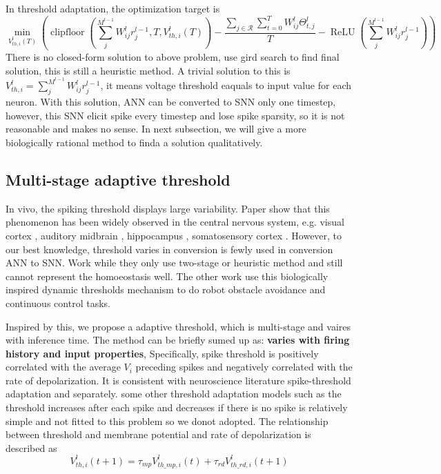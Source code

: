 \documentclass{article}
\begin{document}
In threshold adaptation, the optimization target is 
\begin{equation}
  \min\limits_{V_{th,i}^l(T)}\left(\operatorname{clipfloor}\left(\sum_j^{M^{l-1}}W_{ij}^lr_j^{l-1}, T, V_{th,i}^l(T)\right) - \frac{\sum_{j \in \mathcal{R}} \sum_{t=0}^TW_{ij}^l\Theta_{t,j}^l }{T} - \operatorname{ReLU}\left(\sum_j^{M^{l-1}}W_{ij}^lr_j^{l-1}\right)\right)
\end{equation}
There is no closed-form solution to above problem, \cite{li2021free} use gird search to find final solution, this is still a heuristic method.
A trivial solution to this is $V_{th,i}^l=\sum_j^{M^{l-1}}W_{ij}^lr_j^{l-1}$, it means voltage threshold eaquals to input value for each neuron. With this solution, ANN can be converted to SNN only one timestep, however, this SNN elicit spike every timestep and lose spike sparsity, so it is not reasonable and makes no sense.
In next subsection, we will give a more biologically rational method to finda a solution qualitatively.

\subsection{Multi-stage adaptive threshold}

In vivo, the spiking threshold displays large variability. Paper \cite{fontaine2014spike} show that this phenomenon has been widely observed in
the central nervous system, e.g. visual cortex \cite{azouz2000dynamic, azouz2003adaptive}, auditory
midbrain \cite{pena2002postsynaptic}, hippocampus \cite{henze2001action}, somatosensory cortex \cite{wilent2005stimulus}. 
However, to our best knowledge, threshold varies in conversion is fewly used in conversion ANN to SNN. Work\cite{kim2020towards,chen2022adaptive,li2021free} while they only use two-stage or heuristic method and still cannot represent the homoeostasis well.
The other work\cite{ding2022biologically} use this biologically inspired dynamic thresholds mechanism to do robot obstacle avoidance and continuous control tasks. 

Inspired by this, we propose a adaptive threshold, which is multi-stage and vaires with inference time.
The method can be briefly sumed up as: \textbf{varies with firing history and input properties},
Specifically, spike threshold is positively correlated with the average $V_i$ preceding spikes and negatively correlated with the rate of depolarization. 
It is consistent with neuroscience literature spike-threshold adaptation \cite{platkiewicz2010threshold, fontaine2014spike} and \cite{azouz2000dynamic} separately.
some other threshold adaptation models such as the threshold increases after each spike and decreases if there is no spike\cite{querlioz2013immunity, diehl2015unsupervised} is relatively simple and not fitted to this problem so we donot adopted. 
The relationship between threshold and membrane potential and rate of depolarization is described as
\begin{equation}
  V_{th,i}^l(t+1) = \tau_{mp}V_{th\_mp,i}^l(t) + \tau_{rd}V_{th\_rd,i}^l(t+1)
\end{equation}
\end{document}
